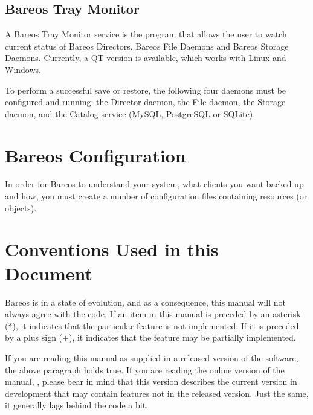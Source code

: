 
\subsection*{Bareos Tray Monitor}
   \label{MonDef}
   A Bareos Tray Monitor service is the program that allows the
   user to watch current status of Bareos Directors,
   Bareos File Daemons and Bareos Storage Daemons.
   Currently, a QT version is available, which works with Linux and Windows.

   To perform a successful save or restore, the following four daemons must be
   configured and running: the Director daemon, the File daemon, the Storage
   daemon, and the Catalog service (MySQL, PostgreSQL or SQLite).

\section{Bareos Configuration}

In order for Bareos to understand your system, what clients you want backed
up and how, you must create a number of configuration files containing
resources (or objects).%


\section{Conventions Used in this Document}

Bareos is in a state of evolution, and as a consequence, this manual
will not always agree with the code. If an item in this manual is preceded by
an asterisk (*), it indicates that the particular feature is not implemented.
If it is preceded by a plus sign (+), it indicates that the feature may be
partially implemented.

If you are reading this manual as supplied in a released version of the
software, the above paragraph holds true. If you are reading the online
version of the manual,
, please bear in
mind that this version describes the current version in development
that may contain features not in the released version. Just the same, it
generally lags behind the code a bit.

